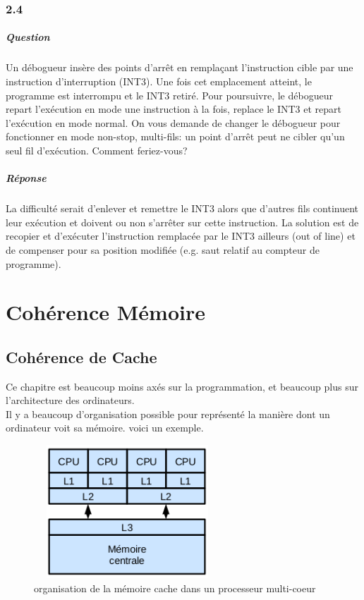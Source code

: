 \documentclass[oneside]{book}
\begin{document}
\subsection{2.4}
\paragraph{Question}
Un débogueur insère des points d'arrêt en remplaçant l'instruction cible par une
instruction d'interruption (INT3). Une fois cet emplacement atteint, le programme
est interrompu et le INT3 retiré. Pour poursuivre, le débogueur repart l'exécution
en mode une instruction à la fois, replace le INT3 et repart l'exécution en mode
normal. On vous demande de changer le débogueur pour fonctionner en mode
non-stop, multi-fils: un point d'arrêt peut ne cibler qu'un seul fil d'exécution.
Comment feriez-vous?
\paragraph{Réponse}
La difficulté serait d'enlever et remettre le INT3 alors que d'autres fils continuent
leur exécution et doivent ou non s'arrêter sur cette instruction. La solution est de
recopier et d'exécuter l'instruction remplacée par le INT3 ailleurs (out of line) et
de compenser pour sa position modifiée (e.g. saut relatif au compteur de
programme).
\chapter{Cohérence Mémoire}
\section{Cohérence de Cache}
Ce chapitre est beaucoup moins axés sur la programmation, et beaucoup plus sur l'architecture des ordinateurs.\\

Il y a beaucoup d'organisation possible pour représenté la manière dont un ordinateur voit sa mémoire. voici un exemple. 
\begin{figure}
\centering
\includegraphics[height = 5cm, width = 7cm, keepaspectratio]{ArchitectureCache.png}
\caption{organisation de la mémoire cache dans un processeur multi-coeur}
\label{fig:architecturecache}
\end{figure}
\end{document}
